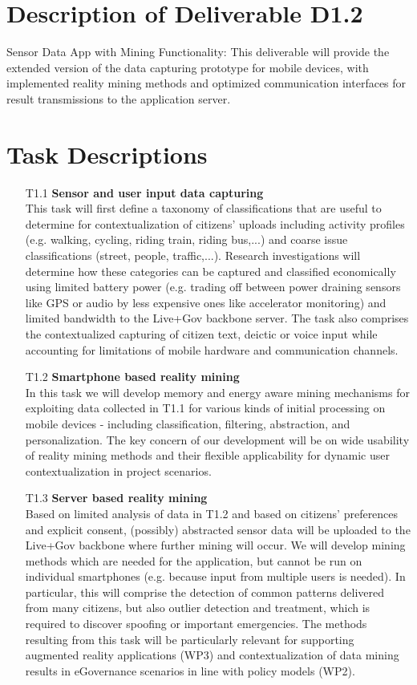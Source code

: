 \documentclass[external]{20120615_deliverable_template_ukob}
\theoremstyle{definition}
\begin{document}
\section{Description of Deliverable D1.2}
Sensor Data App with Mining Functionality: This deliverable will provide the
extended version of the data capturing prototype for mobile devices, with
implemented reality mining methods and optimized communication interfaces for
result transmissions to the application server.

\section{Task Descriptions}
\begin{itemize}
\item[T1.1] {\bf Sensor and user input data capturing} \\
  This task will first define a taxonomy of classifications that are useful to
  determine for contextualization of citizens’ uploads including activity
  profiles (e.g. walking, cycling, riding train, riding bus,...) and coarse
  issue classifications (street, people, traffic,...). Research investigations
  will determine how these categories can be captured and classified
  economically using limited battery power (e.g. trading off between power
  draining sensors like GPS or audio by less expensive ones like accelerator
  monitoring) and limited bandwidth to the Live+Gov backbone server. The task
  also comprises the contextualized capturing of citizen text, deictic or voice
  input while accounting for limitations of mobile hardware and communication
  channels.
\item[T1.2] {\bf Smartphone based reality mining} \\
  In this task we will develop memory and energy aware mining mechanisms for
  exploiting data collected in T1.1 for various kinds of initial processing on
  mobile devices - including classification, filtering, abstraction, and
  personalization. The key concern of our development will be on wide usability
  of reality mining methods and their flexible applicability for dynamic user
  contextualization in project scenarios.
\item[T1.3] {\bf Server based reality mining} \\
  Based on limited analysis of data in T1.2 and based on citizens’ preferences
  and explicit consent, (possibly) abstracted sensor data will be uploaded to
  the Live+Gov backbone where further mining will occur. We will develop mining
  methods which are needed for the application, but cannot be run on individual
  smartphones (e.g.  because input from multiple users is needed). In
  particular, this will comprise the detection of common patterns delivered from
  many citizens, but also outlier detection and treatment, which is required to
  discover spoofing or important emergencies. The methods resulting from this
  task will be particularly relevant for supporting augmented reality
  applications (WP3) and contextualization of data mining results in eGovernance
  scenarios in line with policy models (WP2).
\end{itemize}
\end{document}
